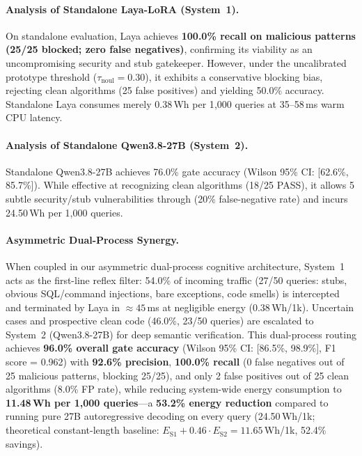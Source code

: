 \documentclass[conference]{IEEEtran}
\begin{document}
\paragraph{Analysis of Standalone Laya-LoRA (System~1).}
On standalone evaluation, Laya achieves \textbf{100.0\% recall on malicious patterns (25/25 blocked; zero false negatives)}, confirming its viability as an uncompromising security and stub gatekeeper. However, under the uncalibrated prototype threshold ($\tau_\text{noul} = 0.30$), it exhibits a conservative blocking bias, rejecting clean algorithms (25 false positives) and yielding 50.0\% accuracy. Standalone Laya consumes merely 0.38\,Wh per 1{,}000 queries at 35--58\,ms warm CPU latency.

\paragraph{Analysis of Standalone Qwen3.8-27B (System~2).}
Standalone Qwen3.8-27B achieves 76.0\% gate accuracy (Wilson 95\% CI: [62.6\%, 85.7\%]). While effective at recognizing clean algorithms (18/25 PASS), it allows 5 subtle security/stub vulnerabilities through (20\% false-negative rate) and incurs 24.50\,Wh per 1{,}000 queries.

\paragraph{Asymmetric Dual-Process Synergy.}
When coupled in our asymmetric dual-process cognitive architecture, System~1 acts as the first-line reflex filter:
54.0\% of incoming traffic (27/50 queries: stubs, obvious SQL/command injections, bare exceptions, code smells) is intercepted and terminated by Laya in $\approx 45$\,ms at negligible energy ($0.38$\,Wh/1k). Uncertain cases and prospective clean code (46.0\%, 23/50 queries) are escalated to System~2 (Qwen3.8-27B) for deep semantic verification.
This dual-process routing achieves \textbf{96.0\% overall gate accuracy} (Wilson 95\% CI: [86.5\%, 98.9\%], F1 score = 0.962) with \textbf{92.6\% precision}, \textbf{100.0\% recall} (0 false negatives out of 25 malicious patterns, blocking 25/25), and only 2 false positives out of 25 clean algorithms (8.0\% FP rate), while reducing system-wide energy consumption to \textbf{11.48\,Wh per 1{,}000 queries}---a \textbf{53.2\% energy reduction} compared to running pure 27B autoregressive decoding on every query (24.50\,Wh/1k; theoretical constant-length baseline: $E_\text{S1} + 0.46 \cdot E_\text{S2} = 11.65$\,Wh/1k, 52.4\% savings).
\end{document}
